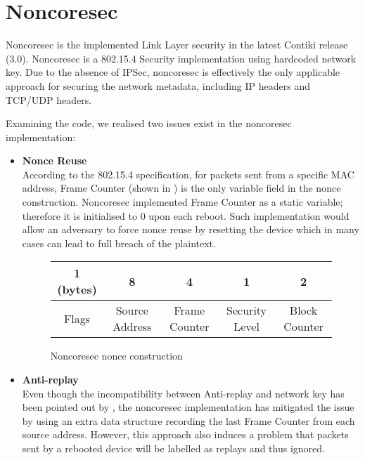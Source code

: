 \section{Noncoresec}
Noncoresec\cite{noncoresec} is the implemented Link Layer\cite{OSI} security in the latest Contiki release (3.0). Noncoresec is a 802.15.4 Security\cite{802154} implementation using hardcoded network key. Due to the absence of IPSec\cite{rfc4301}, noncoresec is effectively the only applicable approach for securing the network metadata, including IP headers and TCP/UDP headers.


Examining the code, we realised two issues exist in the noncoresec implementation:
\begin{itemize}
	\item \textbf{Nonce Reuse} \\
	According to the 802.15.4 specification\cite{802154}, for packets sent from a specific MAC address, Frame Counter (shown in ) is the only variable field in the nonce construction. Noncoresec implemented Frame Counter as a static variable; therefore it is initialised to 0 upon each reboot. Such implementation would allow an adversary to force nonce reuse by resetting the device which in many cases can lead to full breach of the plaintext.
	
	\begin{figure}[th!]
	\centering
	{
		\begin{tabular}{|c|c|c|c|c|}
			\hline 
			1 (bytes) & 8              & 4             & 1              & 2             \\ \hline
			Flags      & Source Address & Frame Counter & Security Level & Block Counter \\ \hline
		\end{tabular}
	}
	\caption{Noncoresec nonce construction}
	\label{NoncoresecNonce}
	\end{figure}
	
	\item \textbf{Anti-replay} \\
	Even though the incompatibility between Anti-replay and network key has been pointed out by \cite{802154SecIssues}, the noncoresec implementation has mitigated the issue by using an extra data structure recording the last Frame Counter from each source address. However, this approach also induces a problem that packets sent by a rebooted device will be labelled as replays and thus ignored.
\end{itemize}

